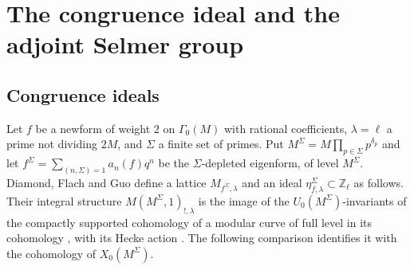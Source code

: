 \documentclass[11pt]{amsart}
\theoremstyle{definition}
\newcommand{\Z}{\mathbb{Z}}
\begin{document}
\section{The congruence ideal and the adjoint Selmer group}\label{sec:quant}

\subsection{Congruence ideals}\label{sec:dfg}
Let $f$ be a newform of weight $2$ on $\Gamma_0(M)$ with rational coefficients, $\lambda=\ell$ a prime not dividing $2M$, and $\Sigma$ a finite set of primes. Put $M^\Sigma=M\prod_{p\in\Sigma}p^{\delta_p}$ and let $f^\Sigma=\sum_{(n,\Sigma)=1}a_n(f)q^n$ be the $\Sigma$-depleted eigenform, of level $M^\Sigma$. Diamond, Flach and Guo define \cite[\S\S1.5.3, 1.6.2, 1.7.3]{DFG04} a lattice $M_{f^\Sigma,\lambda}$ and an ideal $\eta^\Sigma_{f,\lambda}\subset\Z_\ell$ as follows. Their integral structure $M(M^\Sigma,1)_{!,\lambda}$ is the image of the $U_0(M^\Sigma)$-invariants of the compactly supported cohomology of a modular curve of full level in its cohomology \cite[\S\S1.2, 1.4]{DFG04}, with its Hecke action \cite[\S1.6.1]{DFG04}. The following comparison identifies it with the cohomology of $X_0(M^\Sigma)$.
\end{document}
